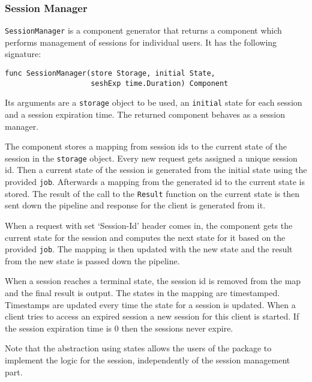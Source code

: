 \subsubsection{Session Manager}
\texttt{SessionManager} is a component generator that returns a component
which performs management of sessions for individual users. It has the following signature:
\begin{lstlisting}
func SessionManager(store Storage, initial State, 
                    seshExp time.Duration) Component
\end{lstlisting}
Its arguments are a \texttt{storage} object to be used, an \texttt{initial} 
state for each session and a session expiration time.
The returned component behaves as a session manager. 

The component stores a mapping from session ids to the current state of the session
in the \texttt{storage} object.
Every new request gets assigned a unique session id. Then a current state
of the session is generated from the initial state using the provided
\texttt{job}. Afterwards a mapping from the generated id to the current state
is stored. The result of the call to the \texttt{Result} function on the
current state is then sent down the pipeline and response for the client 
is generated from it.

When a request with set `Session-Id' header comes in, the component gets the current 
state for the session and computes the next state for it based on the provided 
\texttt{job}.
The mapping is then updated with the new state and the result from the new state
is passed down the pipeline.

When a session reaches a terminal state, the session id is removed from the map
and the final result is output.
The states in the mapping are timestamped. Timestamps are updated every time
the state for a session is updated. When a client tries to access an expired
session a new session for this client is started. If the session expiration
time is 0 then the sessions never expire.

Note that the abstraction using states allows the users of the 
package to implement the logic for the session, independently of 
the session management part.

